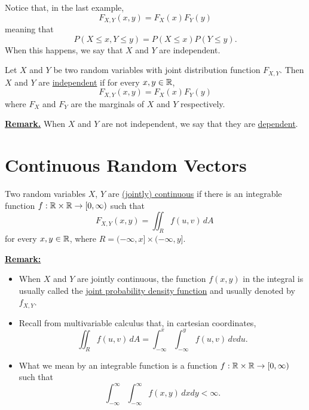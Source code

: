 Notice that, in the last example, 
    \[
        F_{X, Y} (x, y) = F_X (x) F_Y (y)
    \]
meaning that
    \[
        P (X \leq x , Y \leq y) = P (X \leq x) P (Y \leq y) .
    \]
When this happens, we say that $X$ and $Y$ are independent.

\begin{definition}
Let $X$ and $Y$ be two random variables with joint distribution function $F_{X, Y}$. Then $X$ and $Y$ are \underline{independent} if for every $x, y \in \mathbb{R}$,
    \[
        F_{X, Y} (x, y) = F_X (x) F_Y (y)    \]
where $F_X$ and $F_Y$ are the marginals of $X$ and $Y$ respectively.
\end{definition}

\underline{\textbf{Remark.}} When $X$ and $Y$ are not independent, we say that they are \underline{dependent}.

\section{Continuous Random Vectors}

\begin{definition}
Two random variables $X$, $Y$ are \underline{(jointly) continuous} if there is an integrable function $f : \mathbb{R} \times \mathbb{R} \rightarrow [0, \infty )$ such that
    \[
        F_{X, Y} (x, y) = \iint_{R} f(u, v) \, dA \,
    \]
for every $x, y \in \mathbb{R}$, where $R = (-\infty , x] \times (-\infty , y]$.
\end{definition}

\underline{\textbf{Remark:}} 
    \begin{itemize}
    \item When $X$ and $Y$ are jointly continuous, the function $f(x, y)$ in the integral is usually called the \underline{joint probability density function} and usually denoted by $f_{X, Y}$. 
    \item Recall from multivariable calculus that, in cartesian coordinates,
        \[
            \iint_R f (u, v) \, dA  = \int_{-\infty}^x \int_{-\infty}^y f(u, v) \, dv du .
        \]
    \item What we mean by an integrable function is a function $f : \mathbb{R} \times \mathbb{R} \rightarrow [0, \infty )$ such that
        \[
            \int_{-\infty}^\infty \int_{-\infty}^\infty f (x, y) \, dx dy < \infty .
        \]
    \end{itemize}

